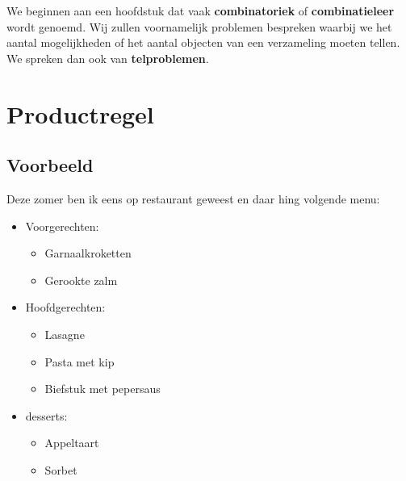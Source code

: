 \documentclass[12pt,a4paper,twoside]{article}
\begin{document}
{\singlespacing\footnotesize\tableofcontents\thispagestyle{empty}}

\pagebreak
{}

We beginnen aan een hoofdstuk dat vaak {\bf combinatoriek} of {\bf combinatieleer} wordt genoemd. Wij zullen voornamelijk problemen bespreken waarbij we het aantal mogelijkheden of het aantal objecten van een verzameling moeten tellen. We spreken dan ook van {\bf telproblemen}.

\section{Productregel}

\subsection{Voorbeeld}

Deze zomer ben ik eens op restaurant geweest en daar hing volgende menu:

\begin{center}
  \begin{minipage}{0.6\linewidth}
    \begin{mdframed}
      \begin{itemize}
      \item Voorgerechten:
        \begin{itemize}
        \item Garnaalkroketten
        \item Gerookte zalm
        \end{itemize}
      \item Hoofdgerechten:
        \begin{itemize}
        \item Lasagne
        \item Pasta met kip
        \item Biefstuk met pepersaus
        \end{itemize}
      \item desserts:
        \begin{itemize}
        \item Appeltaart
        \item Sorbet
        \end{itemize}
      \end{itemize}
    \end{mdframed}
  \end{minipage}
\end{center}
\end{document}
